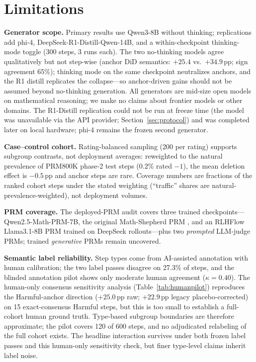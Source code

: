 \documentclass[11pt]{article}
\begin{document}
\section*{Limitations}


\textbf{Generator scope.} Primary results use Qwen3-8B without thinking; replications add phi-4, DeepSeek-R1-Distill-Qwen-14B, and a within-checkpoint thinking-mode toggle (300 steps, 3 runs each). The two no-thinking models agree qualitatively but not step-wise (anchor DiD semantics: $+25.4$ vs.\ $+34.9$\,pp; sign agreement 65\%); thinking mode on the same checkpoint neutralizes anchors, and the R1 distill replicates the collapse---so anchor-driven gains should not be assumed beyond no-thinking generation. All generators are mid-size open models on mathematical reasoning; we make no claims about frontier models or other domains. The R1-Distill replication could not be run at freeze time (the model was unavailable via the API provider; Section~\ref{sec:protocol}) and was completed later on local hardware; phi-4 remains the frozen second generator.

\textbf{Case--control cohort.} Rating-balanced sampling (200 per rating) supports subgroup contrasts, not deployment averages: reweighted to the natural prevalence of PRM800K phase-2 test steps ($0.2\%$ rated $-1$), the mean deletion effect is $-0.5$\,pp and anchor steps are rare. Coverage numbers are fractions of the ranked cohort steps under the stated weighting (``traffic'' shares are natural-prevalence-weighted), not deployment volumes.

\textbf{PRM coverage.} The deployed-PRM audit covers three trained checkpoints---Qwen2.5-Math-PRM-7B, the original Math-Shepherd PRM \citep{wang2024mathshepherd}, and an RLHFlow Llama3.1-8B PRM trained on DeepSeek rollouts---plus two \emph{prompted} LLM-judge PRMs; trained \emph{generative} PRMs \citep{khalifa2025process} remain uncovered.

\textbf{Semantic label reliability.} Step types come from AI-assisted annotation with human calibration; the two label passes disagree on 27.3\% of steps, and the blinded annotation pilot shows only moderate human agreement ($\kappa=0.40$). The human-only consensus sensitivity analysis (Table~\ref{tab:humanpilot}) reproduces the Harmful-anchor direction ($+25.0$\,pp raw; $+22.9$\,pp legacy placebo-corrected) on 15 exact-consensus Harmful steps, but this is too small to establish a full-cohort human ground truth. Type-based subgroup boundaries are therefore approximate; the pilot covers 120 of 600 steps, and no adjudicated relabeling of the full cohort exists. The headline interaction survives under both frozen label passes and this human-only sensitivity check, but finer type-level claims inherit label noise.
\end{document}

